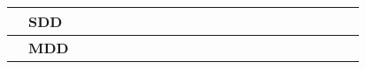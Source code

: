 \begin{table}[ht]
\begin{tabular}{ll|llllllllllllllllllll|}
    \multicolumn{1}{|l|}{\cellcolor[HTML]{38FFF8}\textbf{}}                & \cellcolor[HTML]{38FFF8}\textbf{SDD}                                                                                 & \multicolumn{1}{l|}{}                                   & \multicolumn{1}{l|}{}                                   & \multicolumn{1}{l|}{\cellcolor[HTML]{F8A102}}           & \multicolumn{1}{l|}{\cellcolor[HTML]{F8A102}}           & \multicolumn{1}{l|}{\cellcolor[HTML]{F8A102}}           & \multicolumn{1}{l|}{\cellcolor[HTML]{F8A102}}           & \multicolumn{1}{l|}{}                                   & \multicolumn{1}{l|}{}                                   & \multicolumn{1}{l|}{}                                   & \multicolumn{1}{l|}{}                                    & \multicolumn{1}{l|}{}                                    & \multicolumn{1}{l|}{}                                    & \multicolumn{1}{l|}{}                                    & \multicolumn{1}{l|}{}                                    & \multicolumn{1}{l|}{}                                    & \multicolumn{1}{l|}{}                                    & \multicolumn{1}{l|}{}                                    & \multicolumn{1}{l|}{}                                    & \multicolumn{1}{l|}{}                                    &             \\ \hline
    \multicolumn{1}{|l|}{\cellcolor[HTML]{38FFF8}\textbf{}}                & \cellcolor[HTML]{38FFF8}\textbf{MDD}                                                                                 & \multicolumn{1}{l|}{}                                   & \multicolumn{1}{l|}{}                                   & \multicolumn{1}{l|}{}                                   & \multicolumn{1}{l|}{}                                   & \multicolumn{1}{l|}{}                                   & \multicolumn{1}{l|}{}                                   & \multicolumn{1}{l|}{\cellcolor[HTML]{F8A102}}           & \multicolumn{1}{l|}{\cellcolor[HTML]{F8A102}}           & \multicolumn{1}{l|}{\cellcolor[HTML]{F8A102}}           & \multicolumn{1}{l|}{\cellcolor[HTML]{F8A102}}            & \multicolumn{1}{l|}{\cellcolor[HTML]{F8A102}}            & \multicolumn{1}{l|}{\cellcolor[HTML]{F8A102}}            & \multicolumn{1}{l|}{\cellcolor[HTML]{F8A102}}            & \multicolumn{1}{l|}{\cellcolor[HTML]{F8A102}}            & \multicolumn{1}{l|}{\cellcolor[HTML]{F8A102}}            & \multicolumn{1}{l|}{\cellcolor[HTML]{F8A102}}            & \multicolumn{1}{l|}{\cellcolor[HTML]{F8A102}}            & \multicolumn{1}{l|}{\cellcolor[HTML]{F8A102}}            & \multicolumn{1}{l|}{}                                    &             \\ \hline

\end{tabular}
\end{table}
